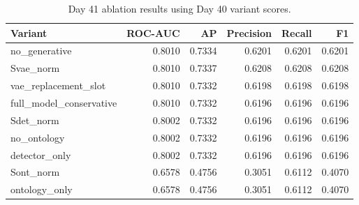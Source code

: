 \begin{table}[t]
\centering
\caption{Day 41 ablation results using Day 40 variant scores.}
\label{tab:day41_ablation_day40}
\begin{tabular}{lrrrrr}
\toprule
Variant & ROC-AUC & AP & Precision & Recall & F1 \\
\midrule
no\_generative & 0.8010 & 0.7334 & 0.6201 & 0.6201 & 0.6201 \\
Svae\_norm & 0.8010 & 0.7337 & 0.6208 & 0.6208 & 0.6208 \\
vae\_replacement\_slot & 0.8010 & 0.7332 & 0.6198 & 0.6198 & 0.6198 \\
full\_model\_conservative & 0.8010 & 0.7332 & 0.6196 & 0.6196 & 0.6196 \\
Sdet\_norm & 0.8002 & 0.7332 & 0.6196 & 0.6196 & 0.6196 \\
no\_ontology & 0.8002 & 0.7332 & 0.6196 & 0.6196 & 0.6196 \\
detector\_only & 0.8002 & 0.7332 & 0.6196 & 0.6196 & 0.6196 \\
Sont\_norm & 0.6578 & 0.4756 & 0.3051 & 0.6112 & 0.4070 \\
ontology\_only & 0.6578 & 0.4756 & 0.3051 & 0.6112 & 0.4070 \\
\bottomrule
\end{tabular}
\end{table}
